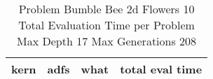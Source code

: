 \begin{table}[H]
\caption{Problem  Bumble Bee 2d  Flowers 10\\Total Evaluation Time per Problem \\ Max Depth 17 Max Generations 208\\}
\begin{center}
\scalebox{1.0} %
{
\begin{tabular}{lllr}
\hline
kern & adfs & what & total eval time \\
\hline


\end{tabular}
}
\end{center}
\end{table}

